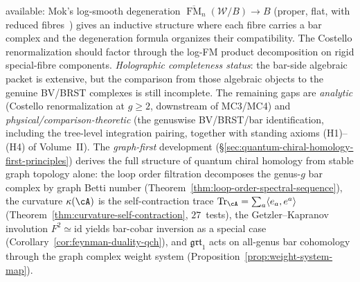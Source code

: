 \begin{remark}
available: Mok's log-smooth degeneration
$\overline{\operatorname{FM}}_n(\mathcal{W}/B) \to B$ (proper,
flat, with reduced fibres~\cite[Theorem~5.2.3]{Mok25}) gives an
inductive structure where each fibre carries a bar complex and the
degeneration formula organizes their compatibility. The Costello
renormalization should factor through the log-FM product
decomposition on rigid special-fibre components.
\emph{Holographic completeness status}: the bar-side algebraic packet
is extensive, but the comparison from those algebraic objects to the
genuine BV/BRST complexes is still incomplete. The remaining gaps are
\emph{analytic} (Costello renormalization at $g \ge 2$,
downstream of MC3/MC4) and \emph{physical/comparison-theoretic}
\textup{(}the genuswise BV/BRST/bar identification, including the
tree-level integration pairing, together with standing axioms
(H1)--(H4) of Volume~II\textup{)}.
The \emph{graph-first} development
(\S\ref{sec:quantum-chiral-homology-first-principles}) derives the
full structure of quantum chiral homology from stable graph topology
alone: the loop order filtration decomposes the genus-$g$ bar complex
by graph Betti number (Theorem~\ref{thm:loop-order-spectral-sequence}),
the curvature $\kappa(\cA)$ is the self-contraction trace
$\mathrm{Tr}_\cA = \sum_a\langle e_a, e^a\rangle$
(Theorem~\ref{thm:curvature-self-contraction}, $27$~tests), the
Getzler--Kapranov involution $F^2\simeq\mathrm{id}$ yields bar-cobar
inversion as a special case
(Corollary~\ref{cor:feynman-duality-qch}), and
$\mathfrak{grt}_1$ acts on all-genus bar cohomology through the
graph complex weight system
(Proposition~\ref{prop:weight-system-map}).
\end{remark}

